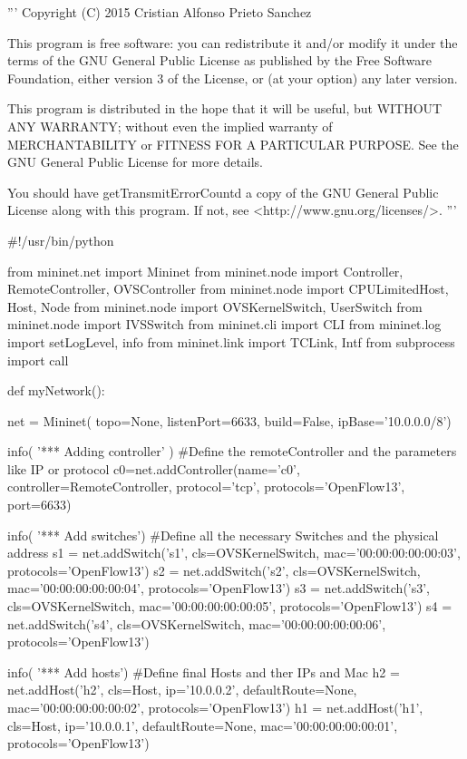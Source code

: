 \documentclass[a4paper,11pt]{book}
\begin{document}
\begin{python}
'''
Copyright (C) 2015  Cristian Alfonso Prieto Sanchez

This program is free software: you can redistribute it and/or modify
it under the terms of the GNU General Public License as published by
the Free Software Foundation, either version 3 of the License, or
(at your option) any later version.

This program is distributed in the hope that it will be useful,
but WITHOUT ANY WARRANTY; without even the implied warranty of
MERCHANTABILITY or FITNESS FOR A PARTICULAR PURPOSE. See the
GNU General Public License for more details.

You should have getTransmitErrorCountd a copy of the GNU General Public License
along with this program. If not, see <http://www.gnu.org/licenses/>.
'''


#!/usr/bin/python

from mininet.net import Mininet
from mininet.node import Controller, RemoteController, OVSController
from mininet.node import CPULimitedHost, Host, Node
from mininet.node import OVSKernelSwitch, UserSwitch
from mininet.node import IVSSwitch
from mininet.cli import CLI
from mininet.log import setLogLevel, info
from mininet.link import TCLink, Intf
from subprocess import call

def myNetwork():

    net = Mininet( topo=None,
                   listenPort=6633,
                   build=False,
                   ipBase='10.0.0.0/8')

    info( '*** Adding controller\n' ) #Define the remoteController and the parameters like IP or protocol
    c0=net.addController(name='c0',
                      controller=RemoteController,
                      protocol='tcp', protocols='OpenFlow13',
                      port=6633)

    info( '*** Add switches\n') #Define all the necessary Switches and the physical address
    s1 = net.addSwitch('s1', cls=OVSKernelSwitch, mac='00:00:00:00:00:03', protocols='OpenFlow13')
    s2 = net.addSwitch('s2', cls=OVSKernelSwitch, mac='00:00:00:00:00:04', protocols='OpenFlow13')
    s3 = net.addSwitch('s3', cls=OVSKernelSwitch, mac='00:00:00:00:00:05', protocols='OpenFlow13')
    s4 = net.addSwitch('s4', cls=OVSKernelSwitch, mac='00:00:00:00:00:06', protocols='OpenFlow13')

    info( '*** Add hosts\n') #Define final Hosts and ther IPs and Mac
    h2 = net.addHost('h2', cls=Host, ip='10.0.0.2', defaultRoute=None, mac='00:00:00:00:00:02', protocols='OpenFlow13')
    h1 = net.addHost('h1', cls=Host, ip='10.0.0.1', defaultRoute=None, mac='00:00:00:00:00:01', protocols='OpenFlow13')


\end{python}
\end{document}
